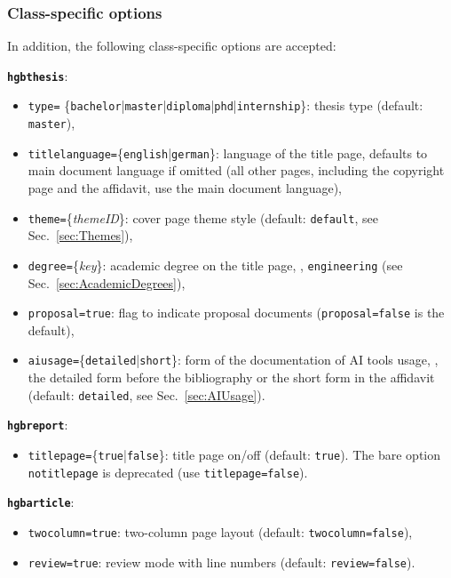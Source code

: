 \documentclass[language=english]{hgbarticle}
\begin{document}
\subsubsection{Class-specific options}

In addition, the following class-specific options are accepted:

\noindent\textbf{\texttt{hgbthesis}}:
	\begin{itemize}
		\item \texttt{type=}%
			\{\texttt{bachelor}|\texttt{master}|\texttt{diploma}|\texttt{phd}|\texttt{internship}\}:
				thesis type (default: \texttt{master}),
		\item \texttt{titlelanguage=}\{\texttt{english}|\texttt{german}\}:
			language of the title page, defaults to main document language if omitted (all other pages,
			including the copyright page and the affidavit, use the main document language),
		\item \texttt{theme=}\{\textit{themeID}\}:
			cover page theme style (default: \texttt{default}, see Sec.~\ref{sec:Themes}),
		\item \texttt{degree=}\{\textit{key}\}:
			academic degree on the title page, \eg, \texttt{engineering} (see Sec.~\ref{sec:AcademicDegrees}),
		\item \texttt{proposal=true}: flag to indicate proposal documents (\texttt{proposal=false} is the default),
		\item \texttt{aiusage=}\{\texttt{detailed}|\texttt{short}\}:
			form of the documentation of AI tools usage, \ie, the detailed form before the bibliography or the
			short form in the affidavit (default: \texttt{detailed}, see Sec.~\ref{sec:AIUsage}).
	\end{itemize}

\noindent\textbf{\texttt{hgbreport}}:
	\begin{itemize}
		\item \texttt{titlepage=}\{\texttt{true}|\texttt{false}\}:
			title page on/off (default: \texttt{true}).
			The bare option \texttt{notitlepage} is deprecated (use \texttt{titlepage=false}).
	\end{itemize}

\noindent\textbf{\texttt{hgbarticle}}:
	\begin{itemize}
		\item \texttt{twocolumn=true}: two-column page layout (default: \texttt{twocolumn=false}),
		\item \texttt{review=true}: review mode with line numbers (default: \texttt{review=false}).
	\end{itemize}
\end{document}
